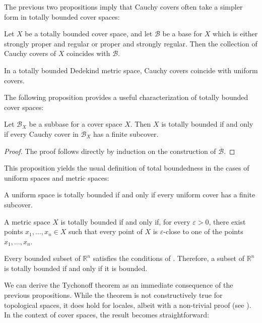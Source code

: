 \documentclass[pdflatex,sn-mathphys-num]{sn-jnl}
\theoremstyle{definition}
\theoremstyle{remark}
\numberwithin{figure}{section}
\begin{document}
The previous two propositions imply that Cauchy covers often take a simpler form in totally bounded cover spaces:

\begin{cor}
Let $X$ be a totally bounded cover space, and let $\mathcal{B}$ be a base for $X$ which is either strongly proper and regular or proper and strongly regular.
Then the collection of Cauchy covers of $X$ coincides with $\mathcal{B}$.
\end{cor}

\begin{cor}
In a totally bounded Dedekind metric space, Cauchy covers coincide with uniform covers.
\end{cor}

The following proposition provides a useful characterization of totally bounded cover spaces:

\begin{prop}[tb-aux]
Let $\mathcal{B}_X$ be a subbase for a cover space $X$.
Then $X$ is totally bounded if and only if every Cauchy cover in $\mathcal{B}_X$ has a finite subcover.
\end{prop}
\begin{proof}
The proof follows directly by induction on the construction of $\overline{\mathcal{B}}$.
\end{proof}

This proposition yields the usual definition of total boundedness in the cases of uniform spaces and metric spaces:

\begin{cor}
A uniform space is totally bounded if and only if every uniform cover has a finite subcover.
\end{cor}

\begin{cor}[tb-metric]
A metric space $X$ is totally bounded if and only if, for every $\varepsilon > 0$,
there exist points $x_1, \ldots, x_n \in X$ such that every point of $X$ is $\varepsilon$-close to one of the points $x_1, \ldots, x_n$.
\end{cor}

\begin{example}
Every bounded subset of $\mathbb{R}^n$ satisfies the conditions of .
Therefore, a subset of $\mathbb{R}^n$ is totally bounded if and only if it is bounded.
\end{example}

We can derive the Tychonoff theorem as an immediate consequence of the previous propositions.
While the theorem is not constructively true for topological spaces, it does hold for locales, albeit with a non-trivial proof (see \cite{vickers-tychonoff,vickers-compact}).
In the context of cover spaces, the result becomes straightforward:
\end{document}
